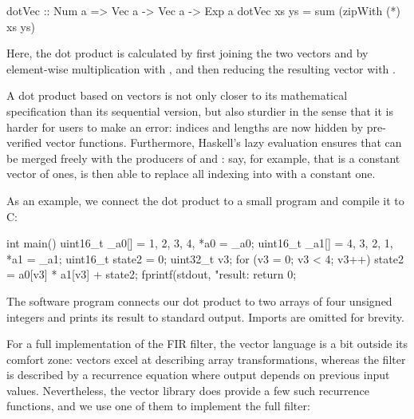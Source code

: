 \documentclass[../paper.tex]{subfiles}
\begin{document}
\begin{code}
dotVec :: Num a => Vec a -> Vec a -> Exp a
dotVec xs ys = sum (zipWith (*) xs ys)
\end{code}

\noindent Here, the dot product is calculated by first joining the two vectors  and  by element-wise multiplication with , and then reducing the resulting vector with .


A dot product based on vectors is not only closer to its mathematical specification than its sequential version, but also sturdier in the sense that it is harder for users to make an error: indices and lengths are now hidden by pre-verified vector functions. Furthermore, Haskell's lazy evaluation ensures that  can be merged freely with the producers of  and : say, for example, that  is a constant vector of ones,  is then able to replace all indexing into  with a constant one.

As an example, we connect the dot product to a small program and compile it to C:

\begin{code}
int main() {
  uint16_t _a0[] = {1, 2, 3, 4}, *a0 = _a0;
  uint16_t _a1[] = {4, 3, 2, 1}, *a1 = _a1;
  uint16_t state2 = 0;
  uint32_t v3;
  for (v3 = 0; v3 < 4; v3++)
    state2 = a0[v3] * a1[v3] + state2;
  fprintf(stdout, "result: %
  return 0;
}
\end{code}

\noindent The software program connects our dot product to two arrays of four unsigned integers and prints its result to standard output. Imports are omitted for brevity.

For a full implementation of the FIR filter, the vector language is a bit outside its comfort zone: vectors excel at describing array transformations, whereas the filter is described by a recurrence equation where output depends on previous input values. Nevertheless, the vector library does provide a few such recurrence functions, and we use one of them to implement the full filter:

\end{document}
